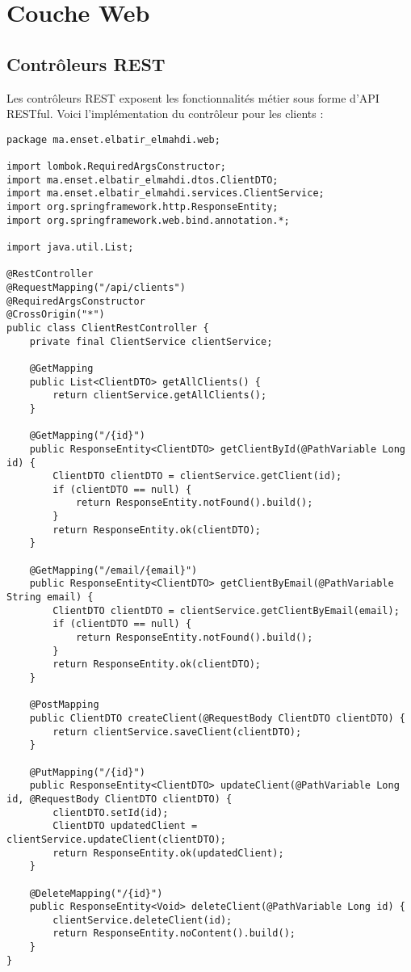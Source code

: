 \section{Couche Web}
\subsection{Contrôleurs REST}
Les contrôleurs REST exposent les fonctionnalités métier sous forme d'API RESTful. Voici l'implémentation du contrôleur pour les clients :

\begin{lstlisting}[caption=Contrôleur REST pour Client]
package ma.enset.elbatir_elmahdi.web;

import lombok.RequiredArgsConstructor;
import ma.enset.elbatir_elmahdi.dtos.ClientDTO;
import ma.enset.elbatir_elmahdi.services.ClientService;
import org.springframework.http.ResponseEntity;
import org.springframework.web.bind.annotation.*;

import java.util.List;

@RestController
@RequestMapping("/api/clients")
@RequiredArgsConstructor
@CrossOrigin("*")
public class ClientRestController {
    private final ClientService clientService;

    @GetMapping
    public List<ClientDTO> getAllClients() {
        return clientService.getAllClients();
    }

    @GetMapping("/{id}")
    public ResponseEntity<ClientDTO> getClientById(@PathVariable Long id) {
        ClientDTO clientDTO = clientService.getClient(id);
        if (clientDTO == null) {
            return ResponseEntity.notFound().build();
        }
        return ResponseEntity.ok(clientDTO);
    }

    @GetMapping("/email/{email}")
    public ResponseEntity<ClientDTO> getClientByEmail(@PathVariable String email) {
        ClientDTO clientDTO = clientService.getClientByEmail(email);
        if (clientDTO == null) {
            return ResponseEntity.notFound().build();
        }
        return ResponseEntity.ok(clientDTO);
    }

    @PostMapping
    public ClientDTO createClient(@RequestBody ClientDTO clientDTO) {
        return clientService.saveClient(clientDTO);
    }

    @PutMapping("/{id}")
    public ResponseEntity<ClientDTO> updateClient(@PathVariable Long id, @RequestBody ClientDTO clientDTO) {
        clientDTO.setId(id);
        ClientDTO updatedClient = clientService.updateClient(clientDTO);
        return ResponseEntity.ok(updatedClient);
    }

    @DeleteMapping("/{id}")
    public ResponseEntity<Void> deleteClient(@PathVariable Long id) {
        clientService.deleteClient(id);
        return ResponseEntity.noContent().build();
    }
}
\end{lstlisting}

